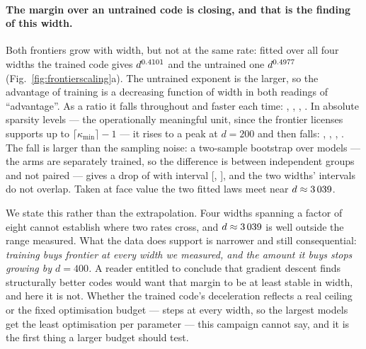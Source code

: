 \paragraph{The margin over an untrained code is closing, and that is the finding of this width.}
Both frontiers grow with width, but not at the same rate: fitted over all four widths the trained
code gives $d^{0.4101}$ and the untrained one $d^{0.4977}$
(Fig.~\ref{fig:frontierscaling}a). The untrained exponent is the larger, so the advantage of training
is a decreasing function of width in both readings of ``advantage''. As a ratio it falls throughout
and faster each time: \MarginFiftyRatio, \MarginHundredRatio, \MarginTwoHundredRatio,
\MarginFourHundredRatio. In absolute sparsity levels --- the operationally meaningful unit, since the
frontier licenses supports up to $\lceil\kappa_{\min}\rceil-1$ --- it rises to a peak at $d=200$ and
then falls: \MarginFiftyGap, \MarginHundredGap, \MarginTwoHundredGap, \MarginFourHundredGap. The fall
is larger than the sampling noise: a two-sample bootstrap over models --- the arms are separately
trained, so the difference is between independent groups and not paired --- gives a drop of
\MarginDrop{} with
interval [\MarginDropCiLow, \MarginDropCiHigh], and the two widths' intervals do not overlap. Taken
at face value the two fitted laws meet near $d\approx3\,039$.

We state this rather than the extrapolation. Four widths spanning a factor of eight cannot establish
where two rates cross, and $d\approx3\,039$ is well outside the range measured. What the data
does support is narrower and still consequential: \emph{training buys frontier at every width we
measured, and the amount it buys stops growing by $d=400$.} A reader entitled to conclude that
gradient descent finds structurally better codes would want that margin to be at least stable in
width, and here it is not. Whether the trained code's deceleration reflects a real ceiling or the
fixed optimisation budget --- \EsevenSteps{} steps at every width, so the largest models get the
least optimisation per parameter --- this campaign cannot say, and it is the first thing a larger
budget should test.

